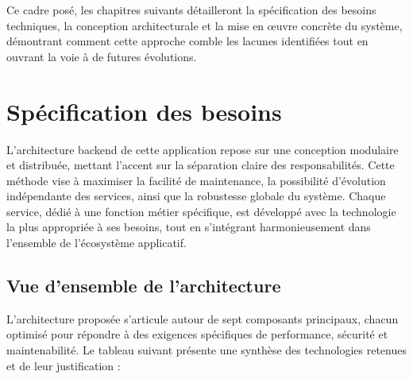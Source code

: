 \documentclass{rapportPfe}
\begin{document}
Ce cadre posé, les chapitres suivants détailleront la spécification des besoins techniques, la conception architecturale et la mise en œuvre concrète du système, démontrant comment cette approche comble les lacunes identifiées tout en ouvrant la voie à de futures évolutions.


\chapter{Spécification des besoins}

L’architecture backend de cette application repose sur une conception modulaire et distribuée, mettant l’accent sur la séparation claire des responsabilités. Cette méthode vise à maximiser la facilité de maintenance, la possibilité d’évolution indépendante des services, ainsi que la robustesse globale du système. Chaque service, dédié à une fonction métier spécifique, est développé avec la technologie la plus appropriée à ses besoins, tout en s’intégrant harmonieusement dans l’ensemble de l’écosystème applicatif.

\section{Vue d'ensemble de l'architecture}
L'architecture proposée s'articule autour de sept composants principaux, chacun optimisé pour répondre à des exigences spécifiques de performance, sécurité et maintenabilité. Le tableau suivant présente une synthèse des technologies retenues et de leur justification :
\end{document}
